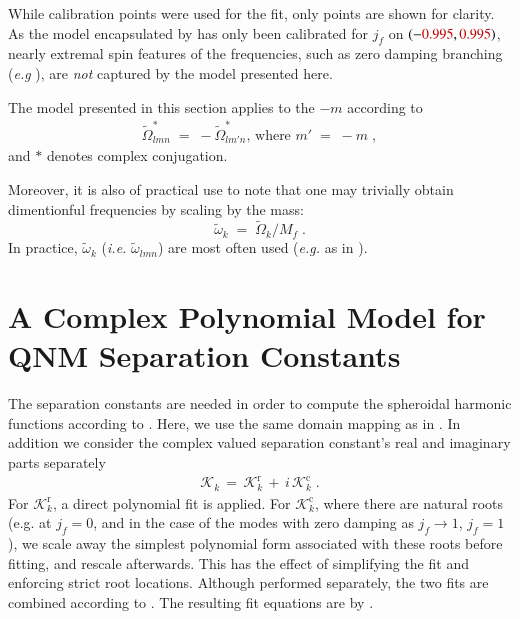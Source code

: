 \documentclass[twocolumn,prd,floatfix,preprintnumbers,a4paper,nofootinbib,superscriptaddress]{revtex4-1}
\newcommand{\cw}{\tilde{\omega}}
\newcommand{\CW}{\tilde{\Omega}}
\newcommand{\SC}{\mathcal{K}}
\def\j{j_f}
\def\CwFitCalibrationRegion{\red{0.995} }
\def\NumCalibrationPointsPlotted{\red{21} }
\def\NumCalibrationPoints{\red{61} }
\begin{document}
%
While \NumCalibrationPoints calibration points were used for the fit, only \NumCalibrationPointsPlotted points are shown for clarity.
%
As the model encapsulated by  has only been calibrated for $\j{}$ on $(-\CwFitCalibrationRegion,\CwFitCalibrationRegion)$, nearly extremal spin features of the \qnm{} frequencies, such as zero damping branching (\textit{e.g} \cite{Yang:2012pj} ), are \textit{not} captured by the model presented here.
%
\par The model presented in this section applies to the $-m$  according to
%
\begin{align}
	\CW_{lmn}^* \; = \; -\CW_{lm'n}^* \text{, where } m' \; = \; -m \;,
	\label{eq:cwsymm}
\end{align}
%
and $*$ denotes complex conjugation.
%
\par Moreover, it is also of practical use to note that one may trivially obtain dimentionful \qnm{} frequencies by scaling by the \bh{} mass: $$\cw_k \; = \; \CW_k / M_f\;.$$
%
In practice, $\cw_k$ (\textit{i.e.} $\cw_{lmn}$) are most often used (\textit{e.g.} as in ).

%
\section{A Complex Polynomial Model for QNM Separation Constants}
%
\par The \qnm{} separation constants are needed in order to compute the spheroidal harmonic functions according to .
%
Here, we use the same domain mapping as in .
%
In addition we consider the complex valued separation constant's real and imaginary parts separately
%
\begin{align}
	\label{eq:scrc}
	\SC_k \, = \, \SC^\mathrm{r}_k \, + \, i\,\SC^\mathrm{c}_k \; .
\end{align}
%
For $\SC^\mathrm{r}_k$, a direct polynomial fit is applied.
%
For $\SC^\mathrm{c}_k$, where there are natural roots (e.g. at $\j{}=0$, and in the case of the modes with zero damping as $\j{}\rightarrow1$, $\j{}=1$), we scale away the simplest polynomial form associated with these roots before fitting, and rescale afterwards.
%
This has the effect of simplifying the fit and enforcing strict root locations.
%
Although performed separately, the two fits are combined according to .
%
The resulting fit equations are by .
%
%
\begin{widetext}
	\red{
		
	}
\end{widetext}
\end{document}
